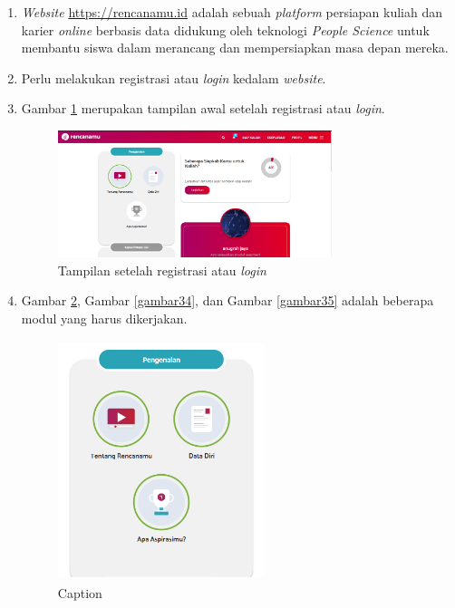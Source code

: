 \begin{enumerate}
    \item \textit{Website} \url{https://rencanamu.id} adalah sebuah \textit{platform} persiapan kuliah dan karier \textit{online} berbasis data didukung oleh teknologi \textit{People Science} untuk membantu siswa dalam merancang dan mempersiapkan masa depan mereka. 
    
    \item Perlu melakukan registrasi atau \textit{login} kedalam \textit{website}.
    
    \item Gambar \ref{gambar32} merupakan tampilan awal setelah registrasi atau \textit{login}.
    
    \begin{figure}[H]
        \centering
        \includegraphics[width = 8cm, height = 5 cm]{doc/DokumenSkripsi/Gambar/gambar32.PNG}
        \caption{Tampilan setelah registrasi atau \textit{login}}
        \label{gambar32}
    \end{figure}
    
    \item Gambar \ref{gambar33}, Gambar \ref{gambar34}, dan Gambar \ref{gambar35} adalah beberapa modul yang harus dikerjakan.
    
    \begin{figure}[H]
        \centering
        \includegraphics[width = 6cm, height = 7cm ]{doc/DokumenSkripsi/Gambar/gambar33.PNG}
        \caption{Caption}
        \label{gambar33}
    \end{figure}
    

\end{enumerate}
